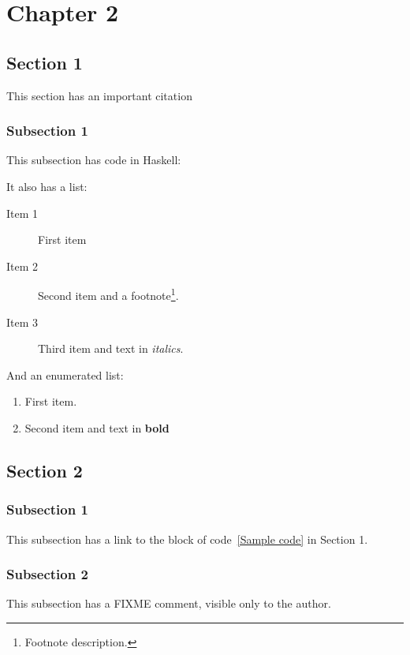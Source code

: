 \chapter{Chapter 2}\label{ch:ch2}

\section{Section 1}

This section has an important citation\cite{inproceeding}

\subsection{Subsection 1}

This subsection has code in Haskell:

It also has a list:
\begin{description}
\item[Item 1]
	First item
\item[Item 2]
	Second item and a footnote\footnote[1]
	{Footnote description.}.
\item[Item 3]
	Third item and text in \textit{italics}.
\end{description}

And an enumerated list:

\begin{enumerate}
\item	First item.
\item	Second item and text in \textbf{bold}
\end{enumerate}

\section{Section 2}

\subsection{Subsection 1}
This subsection has a link to the block of code~\ref{Sample code} in Section 1.

\subsection{Subsection 2}

This subsection has a FIXME comment, visible only to the author.
